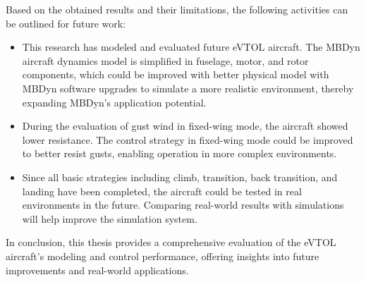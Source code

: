Based on the obtained results and their limitations, the following activities can be outlined for future work:
\begin{itemize}
    \item This research has modeled and evaluated future eVTOL aircraft. The MBDyn aircraft dynamics model is simplified in fuselage, motor, and rotor components, which could be improved with better physical model with MBDyn software upgrades to simulate a more realistic environment, thereby expanding MBDyn's application potential.
    \item During the evaluation of gust wind in fixed-wing mode, the aircraft showed lower resistance. The control strategy in fixed-wing mode could be improved to better resist gusts, enabling operation in more complex environments.
    \item Since all basic strategies including climb, transition, back transition, and landing have been completed, the aircraft could be tested in real environments in the future. Comparing real-world results with simulations will help improve the simulation system.
\end{itemize}

In conclusion, this thesis provides a comprehensive evaluation of the eVTOL aircraft's modeling and control performance, offering insights into future improvements and real-world applications.
